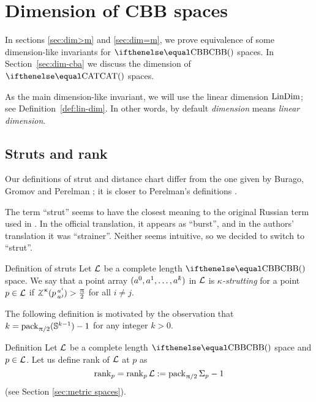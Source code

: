 \chapter{Dimension of CBB spaces}

In sections \ref{sec:dim>m} and \ref{sec:dim=m},
we prove equivalence of some dimension-like invariants for $\Alex{}$ spaces.
In Section~\ref{sec:dim-cba} we discuss the dimension of  $\CAT{}$ spaces.

As the main dimension-like invariant, we will use  the linear dimension $\mathop{\rm LinDim}\nolimits$; 
see Definition~\ref{def:lin-dim}. In other words,  by default {}\emph{dimension} means {}\emph{linear dimension}. 


\section{Struts and rank}\label{sec:struts+rank}

Our definitions of strut 
and distance chart 
differ from the one 
given by 
Burago, 
Gromov 
and Perelman \cite{burago-gromov-perelman};
it is closer to Perelman's definitions \cite{perelman:spaces2,perelman:morse}.

The term ``strut'' seems to have the closest meaning to the original Russian term used in \cite{burago-gromov-perelman}.
In the official translation,
it appears as ``burst'', 
and in the authors' translation it was ``strainer''.
Neither seems intuitive, 
so we decided to switch to ``strut''.




\begin{thm}{Definition of struts}\label{def:strut-I}
Let $\mathcal{L}$ be a complete length $\Alex{}$ space.
We say that a point array $(a^0,a^1,\dots,a^\kay)$ in $\mathcal{L}$
 is \emph{$\kappa$-strutting} for a point $p\in\spc{L}$ if $\angk\kappa p {a^i}{a^j}>\tfrac\pi2$ for all $i\not=j$.
\end{thm} 

The following definition is motivated by the observation that $k=\mathop{\rm pack}\nolimits_{\uppi/2}(\mathbb{S}^{k-1})-1$ for any integer  $k>0$.


\begin{thm}{Definition}\label{def:rank}
Let $\mathcal{L}$ be a complete length $\Alex{}$ space
and $p\in \spc{L}$.
Let us define rank of $\mathcal{L}$ at $p$ as 
\[\mathop{\rm rank}\nolimits_p=\mathop{\rm rank}\nolimits_p\mathcal{L}
:=\mathop{\rm pack}\nolimits_{\uppi/2}\Sigma_p-1\]
(see Section \ref{sec:metric spaces}).
\end{thm}




